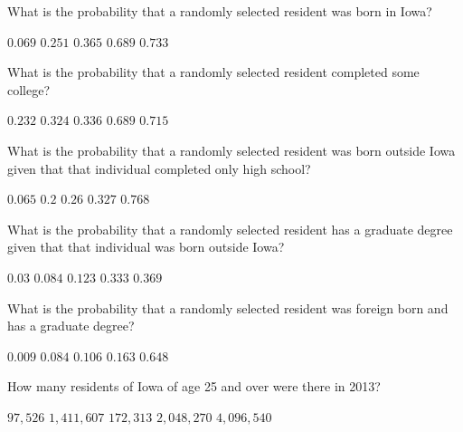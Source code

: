 \documentclass[answers,12pt]{exam}
\begin{document}
\begin{questions}

\question\label{FirstIowa} What is the probability that a randomly selected
resident was born in Iowa?\\
\begin{oneparchoices}
\choice $0.069$ %
\choice $0.251$ %
\choice $0.365$ %
\correctchoice $0.689$
\choice $0.733$ %
\end{oneparchoices}

\question What is the probability that a randomly selected
resident completed some college?\\
\begin{oneparchoices}
\choice $0.232$ %
\correctchoice $0.324$
\choice $0.336$ %
\choice $0.689$ %
\choice $0.715$ %
\end{oneparchoices}

\question What is the probability that a randomly selected
resident was born outside Iowa given that
that individual completed only high school?\\
\begin{oneparchoices}
\choice $0.065$ %
\correctchoice $0.2$
\choice $0.26$ %
\choice $0.327$ %
\choice $0.768$ %
\end{oneparchoices}

\question What is the probability that a randomly selected
resident has a graduate degree given that
that individual was born outside Iowa?\\
\begin{oneparchoices}
\choice $0.03$ %
\choice $0.084$ %
\correctchoice $0.123$
\choice $0.333$ %
\choice $0.369$ %
\end{oneparchoices}

\question What is the probability that a randomly selected
resident was foreign born and has a graduate degree?\\
\begin{oneparchoices}
\correctchoice $0.009$
\choice $0.084$ %
\choice $0.106$ %
\choice $0.163$ %
\choice $0.648$ %
\end{oneparchoices}

\question\label{LastIowa} How many residents of Iowa 
of age 25 and over were there in 2013?\\
\begin{oneparchoices}
\choice $97,526$
\choice $1,411,607$
\choice $172,313$
\correctchoice $2,048,270$
\choice $4,096,540$ %
\end{oneparchoices}


\end{questions}
\end{document}
